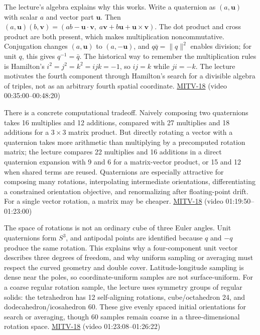 The lecture's algebra explains why this works. Write a quaternion as \((a,\mathbf{u})\) with scalar \(a\) and vector part \(\mathbf{u}\). Then \((a,\mathbf{u})(b,\mathbf{v})=(ab-\mathbf{u}\cdot\mathbf{v},\;a\mathbf{v}+b\mathbf{u}+\mathbf{u}\times\mathbf{v})\). The dot product and cross product are both present, which makes multiplication noncommutative. Conjugation changes \((a,\mathbf{u})\) to \((a,-\mathbf{u})\), and \(q\bar q=\|q\|^2\) enables division; for unit \(q\), this gives \(q^{-1}=\bar q\). The historical way to remember the multiplication rules is Hamilton's \(i^2=j^2=k^2=ijk=-1\), so \(ij=k\) while \(ji=-k\). The lecture motivates the fourth component through Hamilton's search for a divisible algebra of triples, not as an arbitrary fourth spatial coordinate. \hyperref[04-visual-computing-ii-ch036]{MITV-18} (video 00:35:00--00:48:20)

There is a concrete computational tradeoff. Naively composing two quaternions takes 16 multiplies and 12 additions, compared with 27 multiplies and 18 additions for a \(3\times3\) matrix product. But directly rotating a vector with a quaternion takes more arithmetic than multiplying by a precomputed rotation matrix; the lecture compares 22 multiplies and 16 additions in a direct quaternion expansion with 9 and 6 for a matrix-vector product, or 15 and 12 when shared terms are reused. Quaternions are especially attractive for composing many rotations, interpolating intermediate orientations, differentiating a constrained orientation objective, and renormalizing after floating-point drift. For a single vector rotation, a matrix may be cheaper. \hyperref[04-visual-computing-ii-ch036]{MITV-18} (video 01:19:50--01:23:00)

The space of rotations is not an ordinary cube of three Euler angles. Unit quaternions form \(S^3\), and antipodal points are identified because \(q\) and \(-q\) produce the same rotation. This explains why a four-component unit vector describes three degrees of freedom, and why uniform sampling or averaging must respect the curved geometry and double cover. Latitude-longitude sampling is dense near the poles, so coordinate-uniform samples are not surface-uniform. For a coarse regular rotation sample, the lecture uses symmetry groups of regular solids: the tetrahedron has 12 self-aligning rotations, cube/octahedron 24, and dodecahedron/icosahedron 60. These give evenly spaced initial orientations for search or averaging, though 60 samples remain coarse in a three-dimensional rotation space. \hyperref[04-visual-computing-ii-ch036]{MITV-18} (video 01:23:08--01:26:22)

